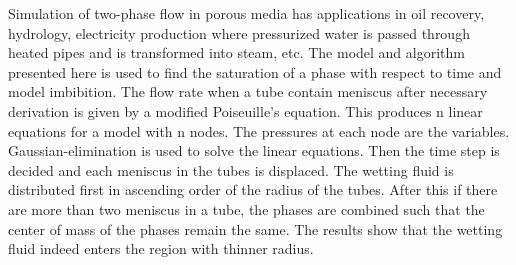Simulation of two-phase flow in porous media has applications in oil recovery, hydrology, electricity production where pressurized water is passed through heated pipes and is transformed into steam, etc. The model and algorithm presented here is used to find the saturation of a phase with respect to time and model imbibition. The flow rate when a tube contain meniscus after necessary derivation is given by a modified Poiseuille’s equation. This produces n linear equations for a model with n nodes. The pressures at each node are the variables. Gaussian-elimination is used to solve the linear equations. Then the time step is decided and each meniscus in the tubes is displaced. The wetting fluid is distributed first in ascending order of the radius of the tubes. After this if there are more than two meniscus in a tube, the phases are combined such that the center of mass of the phases remain the same. The results show that the wetting fluid indeed enters the region with thinner radius.

